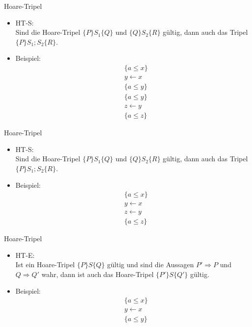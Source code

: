 \begin{frame}{Hoare-Tripel}
  \begin{itemize}
  \item HT-S:\\
    Sind die Hoare-Tripel $\{P\}S_1\{Q\}$ und
    $\{Q\}S_2\{R\}$ gültig, dann auch das Tripel $\{P\}S_1;S_2\{R\}$.
    \item Beispiel:\\
      \begin{align*}
        &\{a\le x\}\\
        &y\leftarrow x\\
        &\{a\le y\}\\
        &\{a\le y\}\\
        &z\leftarrow y\\
        &\{a\le z\}
      \end{align*}
  \end{itemize}
\end{frame}

\begin{frame}{Hoare-Tripel}
  \begin{itemize}
    \item HT-S:\\
      Sind die Hoare-Tripel $\{P\}S_1\{Q\}$ und
      $\{Q\}S_2\{R\}$ gültig, dann auch das Tripel $\{P\}S_1;S_2\{R\}$.
    \item Beispiel:\\
      \begin{align*}
        &\{a\le x\}\\
        &y\leftarrow x\\
        &z\leftarrow y\\
        &\{a\le z\}
      \end{align*}
  \end{itemize}
\end{frame}

\begin{frame}{Hoare-Tripel}
  \begin{itemize}
    \item HT-E:\\
      Ist ein Hoare-Tripel $\{P\}S\{Q\}$ gültig und sind die
      Aussagen $P' \Rightarrow P$ und $Q\Rightarrow Q'$ wahr, dann ist auch das
      Hoare-Tripel $\{P'\}S\{Q'\}$ gültig.
    \item Beispiel: \\
      \begin{align*}
        &\{a\le x\}\\
        &y\leftarrow x\\
        &\{a\le y\}
      \end{align*}
  \end{itemize}
\end{frame}

